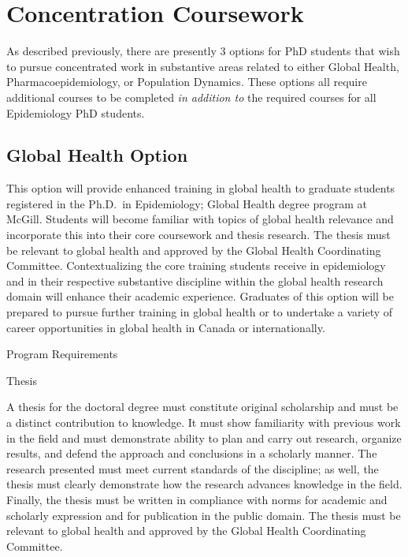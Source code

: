 \documentclass[
]{book}
\begin{document}
\hypertarget{concentration-coursework}{%
\section{Concentration Coursework}\label{concentration-coursework}}

As described previously, there are presently 3 options for PhD students that wish to pursue concentrated work in substantive areas related to either Global Health, Pharmacoepidemiology, or Population Dynamics. These options all require additional courses to be completed \emph{in addition to} the required courses for all Epidemiology PhD students.

\hypertarget{global-health-option}{%
\subsection{Global Health Option}\label{global-health-option}}

This option will provide enhanced training in global health to graduate students registered in the Ph.D.~in Epidemiology; Global Health degree program at McGill. Students will become familiar with topics of global health relevance and incorporate this into their core coursework and thesis research. The thesis must be relevant to global health and approved by the Global Health Coordinating Committee. Contextualizing the core training students receive in epidemiology and in their respective substantive discipline within the global health research domain will enhance their academic experience. Graduates of this option will be prepared to pursue further training in global health or to undertake a variety of career opportunities in global health in Canada or internationally.

Program Requirements

Thesis

A thesis for the doctoral degree must constitute original scholarship and must be a distinct contribution to knowledge. It must show familiarity with previous work in the field and must demonstrate ability to plan and carry out research, organize results, and defend the approach and conclusions in a scholarly manner. The research presented must meet current standards of the discipline; as well, the thesis must clearly demonstrate how the research advances knowledge in the field. Finally, the thesis must be written in compliance with norms for academic and scholarly expression and for publication in the public domain. The thesis must be relevant to global health and approved by the Global Health Coordinating Committee.
\end{document}
